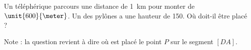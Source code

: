 
\begin{exercice}\label{exo2smath-0152}

    Un téléphérique parcours une distance de \SI{1}{\kilo\meter} pour monter de \( \unit{600}{\meter}\). Un des pylônes a une hauteur de \unit{150}{\meter}. Où doit-il être placé ?

\begin{center}
   
\end{center}

    Note : la question revient à dire où est placé le point \( P\) sur le segment \( [DA]\).

\end{exercice}

